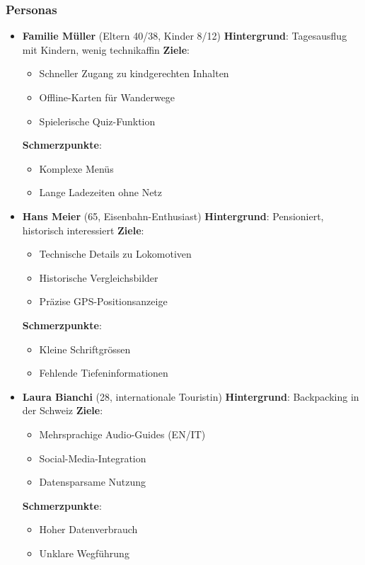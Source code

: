 \documentclass[10pt]{article}
\begin{document}
\subsubsection{Personas}
\begin{itemize}
	\item \textbf{Familie Müller} (Eltern 40/38, Kinder 8/12)
	\subitem \textbf{Hintergrund}: Tagesausflug mit Kindern, wenig technikaffin
	\subitem \textbf{Ziele}: 
	\begin{itemize}
		\item Schneller Zugang zu kindgerechten Inhalten
		\item Offline-Karten für Wanderwege
		\item Spielerische Quiz-Funktion
	\end{itemize}
	\subitem \textbf{Schmerzpunkte}: 
	\begin{itemize}
		\item Komplexe Menüs
		\item Lange Ladezeiten ohne Netz
	\end{itemize}
	
	\item \textbf{Hans Meier} (65, Eisenbahn-Enthusiast)
	\subitem \textbf{Hintergrund}: Pensioniert, historisch interessiert
	\subitem \textbf{Ziele}: 
	\begin{itemize}
		\item Technische Details zu Lokomotiven
		\item Historische Vergleichsbilder
		\item Präzise GPS-Positionsanzeige
	\end{itemize}
	\subitem \textbf{Schmerzpunkte}: 
	\begin{itemize}
		\item Kleine Schriftgrössen
		\item Fehlende Tiefeninformationen
	\end{itemize}
	
	\item \textbf{Laura Bianchi} (28, internationale Touristin)
	\subitem \textbf{Hintergrund}: Backpacking in der Schweiz
	\subitem \textbf{Ziele}: 
	\begin{itemize}
		\item Mehrsprachige Audio-Guides (EN/IT)
		\item Social-Media-Integration
		\item Datensparsame Nutzung
	\end{itemize}
	\subitem \textbf{Schmerzpunkte}: 
	\begin{itemize}
		\item Hoher Datenverbrauch
		\item Unklare Wegführung
	\end{itemize}
	

\end{itemize}
\end{document}
